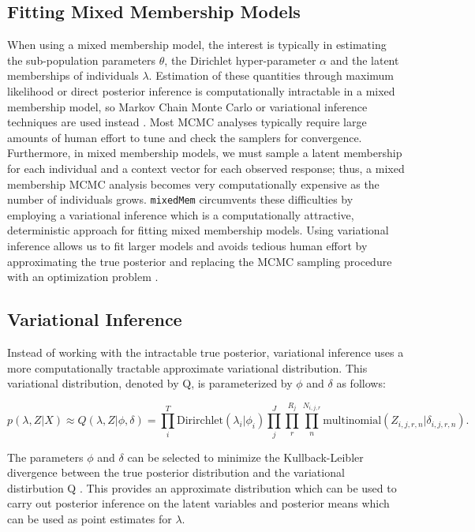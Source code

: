 \documentclass{article}\usepackage[]{graphicx}\usepackage[]{color}
\begin{document}
\subsection{Fitting Mixed Membership Models}
When using a mixed membership model, the interest is typically in estimating the sub-population parameters $\theta$, the Dirichlet hyper-parameter $\alpha$ and the latent memberships of individuals $\lambda$. Estimation of these quantities through maximum likelihood or direct posterior inference is computationally intractable in a mixed membership model, so Markov Chain Monte Carlo or variational inference techniques are used instead \citep{airoldi2009mixed}. Most MCMC analyses typically require large amounts of human effort to tune and check the samplers for convergence. Furthermore, in mixed membership models, we must sample a latent membership for each individual and a context vector for each observed response; thus, a mixed membership MCMC analysis becomes very computationally expensive as the number of individuals grows. \texttt{mixedMem} circumvents these difficulties by employing a variational inference which is a computationally attractive, deterministic approach for fitting mixed membership models. Using variational inference allows us to fit larger models and avoids tedious human effort by approximating the true posterior and replacing the MCMC sampling procedure with an optimization problem \citep{beal2003variational}.  

\subsection{Variational Inference}\label{VI}
Instead of working with the intractable true posterior, variational inference uses a more computationally tractable approximate variational distribution. This variational distribution, denoted by Q, is parameterized by $\phi$ and $\delta$ as follows: 

\begin{equation} \label{eq:varDist}
p(\lambda, Z|X) \approx Q(\lambda,Z|\phi, \delta) = \prod_i^T \text{Dirirchlet}(\lambda_i|\phi_i)\prod_j^J \prod_r^{R_j} \prod_n^{N_{i,j,r}}\text{multinomial}(Z_{i,j,r,n}|\delta_{i,j,r,n}).
\end{equation}

The parameters $\phi$ and $\delta$ can be selected to minimize the Kullback-Leibler divergence between the true posterior distribution and the variational distirbution Q \citep{beal2003variational}. This provides an approximate distribution which can be used to carry out posterior inference on the latent variables and posterior means which can be used as point estimates for $\lambda$.
\end{document}
